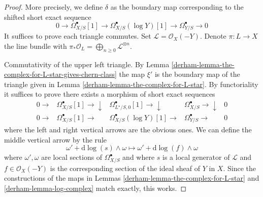 \begin{proof}

More precisely, we define $\delta$ as the boundary map corresponding to the
shifted short exact sequence
$$
0 \to \Omega^\bullet_{X/S}[1] \to
\Omega^\bullet_{X/S}(\log Y)[1] \to
\Omega^\bullet_{Y/S} \to 0
$$
It suffices to prove each triangle commutes. Set
$\mathcal{L} = \mathcal{O}_X(-Y)$. Denote $\pi : L \to X$ the line bundle
with $\pi_*\mathcal{O}_L = \bigoplus_{n \geq 0} \mathcal{L}^{\otimes n}$.

\medskip\noindent
Commutativity of the upper left triangle.
By Lemma \ref{derham-lemma-the-complex-for-L-star-gives-chern-class}
the map $\xi'$ is the boundary map of the triangle given in
Lemma \ref{derham-lemma-the-complex-for-L-star}.
By functoriality it suffices to prove there exists a morphism of
short exact sequences
$$
\begin{array}{ccccc}0 \longrightarrow & \Omega^\bullet_{X/S}[1] \longrightarrow\downarrow & \Omega^\bullet_{L^\star/S, 0}[1] \longrightarrow\downarrow & \Omega^\bullet_{X/S} \longrightarrow\downarrow & 0 \\ 0 \longrightarrow & \Omega^\bullet_{X/S}[1] \longrightarrow & \Omega^\bullet_{X/S}(\log Y)[1] \longrightarrow & \Omega^\bullet_{Y/S} \longrightarrow & 0\end{array}
$$
where the left and right vertical arrows are the obvious ones.
We can define the middle vertical arrow by the rule
$$
\omega' + \text{d}\log(s) \wedge \omega \longmapsto
\omega' + \text{d}\log(f) \wedge \omega
$$
where $\omega', \omega$ are local sections of $\Omega^\bullet_{X/S}$
and where $s$ is a local generator of $\mathcal{L}$ and
$f \in \mathcal{O}_X(-Y)$ is the corresponding section of the ideal
sheaf of $Y$ in $X$. Since the constructions of the maps in
Lemmas \ref{derham-lemma-the-complex-for-L-star} and \ref{derham-lemma-log-complex}
match exactly, this works.


\end{proof}
